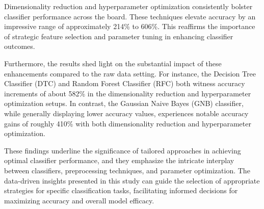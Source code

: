 \documentclass[conference,onecolumn]{IEEEtran}
\begin{document}
    Dimensionality reduction and hyperparameter optimization consistently bolster classifier performance across the board. These techniques elevate accuracy by an impressive range of approximately 214\% to 606\%. This reaffirms the importance of strategic feature selection and parameter tuning in enhancing classifier outcomes.

    Furthermore, the results shed light on the substantial impact of these enhancements compared to the raw data setting. For instance, the Decision Tree Classifier (DTC) and Random Forest Classifier (RFC) both witness accuracy increments of about 582\% in the dimensionality reduction and hyperparameter optimization setups. In contrast, the Gaussian Naive Bayes (GNB) classifier, while generally displaying lower accuracy values, experiences notable accuracy gains of roughly 410\% with both dimensionality reduction and hyperparameter optimization.

    These findings underline the significance of tailored approaches in achieving optimal classifier performance, and they emphasize the intricate interplay between classifiers, preprocessing techniques, and parameter optimization. The data-driven insights presented in this study can guide the selection of appropriate strategies for specific classification tasks, facilitating informed decisions for maximizing accuracy and overall model efficacy.
\end{document}
